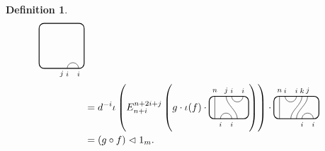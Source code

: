 \documentclass[11pt]{article}
\theoremstyle{plain}
\theoremstyle{definition}
\newtheorem{defn}[thm]{Definition}
\begin{document}
\begin{defn}
\begin{align*}
\begin{tikzpicture}[baseline=.3cm]
\begin{scope}[shift={(0,-.4)}]
    \node at (.8,-.2) {\scriptsize{$j$}};
    \draw (1,0) arc (180:0:.2cm);
    \node at (1,-.2) {\scriptsize{$i$}};
    \node at (1.4,-.2) {\scriptsize{$i$}};
   \end{scope}
   \draw[thick, rounded corners=5pt] (0,-.4) rectangle (1.6,1.2);
  \end{tikzpicture}
  \\&= 
  d^{-i}
  \iota\left(E^{n+2i+j}_{n+i}\left(g\cdot\iota(f)\cdot
  \begin{tikzpicture}[baseline=.3cm]
   \draw (.2,0) -- (.2,.8);
   \node at (.2,1) {\scriptsize{$n$}};
   \draw (.6,.8) .. controls ++(-90:.3cm) and ++ (-270:.3cm) .. (1,0);
   \node at (.6,1) {\scriptsize{$j$}};
   \draw (.8,.8) arc (-180:0:.2cm);
   \node at (.8,1) {\scriptsize{$i$}};
   \node at (1.2,1) {\scriptsize{$i$}};
   \draw (.4,0) arc (180:0:.2cm);
   \node at (.4,-.2) {\scriptsize{$i$}};
   \node at (.8,-.2) {\scriptsize{$i$}};
   \draw[thick, rounded corners=5pt] (0,0) rectangle (1.4,.8);
  \end{tikzpicture}
  \right)\right)\cdot
  \begin{tikzpicture}[baseline=.3cm]
   \draw (.2,0) -- (.2,.8);
   \node at (.2,1) {\scriptsize{$n$}};
   \draw (.4,.8) arc (-180:0:.2cm);
   \node at (.4,1) {\scriptsize{$i$}};
   \node at (.8,1) {\scriptsize{$i$}};
   \draw (.6,0) .. controls ++(90:.3cm) and ++(270:.3cm) .. (1,.8);
   \node at (1,1) {\scriptsize{$k$}};
   \draw (.8,0) .. controls ++(90:.3cm) and ++(270:.3cm) .. (1.2,.8);
   \node at (1.2,1) {\scriptsize{$j$}};
   \draw (1,0) arc (180:0:.2cm);
   \node at (1,-.2) {\scriptsize{$i$}};
   \node at (1.4,-.2) {\scriptsize{$i$}};
   \draw[thick, rounded corners=5pt] (0,0) rectangle (1.6,.8);
  \end{tikzpicture}
  \\&= (g\circ f)\vartriangleleft1_m.
 \end{align*}


\end{defn}
\end{document}
